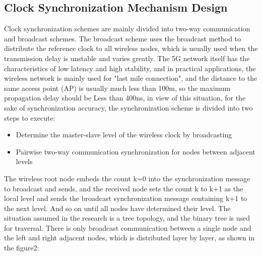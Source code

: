 \documentclass[conference]{IEEEtran}
\begin{document}
	
	\subsection{Clock Synchronization Mechanism Design}\label{CC}
	Clock synchronization schemes are mainly divided into two-way communication and broadcast schemes. The broadcast scheme uses the broadcast method to distribute the reference clock to all wireless nodes, which is usually used when the transmission delay is unstable and varies greatly.
	The 5G network itself has the characteristics of low latency and high stability, and in practical applications, the wireless network is mainly used for "last mile connection", and the distance to the same access point (AP) is usually much less than 100m, so the maximum propagation delay should be Less than 400ns, in view of this situation, for the sake of synchronization accuracy, the synchronization scheme is divided into two steps to execute:
	\begin{itemize}
		\item Determine the master-slave level of the wireless clock by broadcasting
		\item Pairwise two-way communication synchronization for nodes between adjacent levels
	\end{itemize}
	The wireless root node embeds the count k=0 into the synchronization message to broadcast and sends, and the received node sets the count k to k+1 as the local level and sends the broadcast synchronization message containing k+1 to the next level. And so on until all nodes have determined their level.
	The situation assumed in the research is a tree topology, and the binary tree is used for traversal. There is only broadcast communication between a single node and the left and right adjacent nodes, which is distributed layer by layer, as shown in the figure2:
\end{document}
